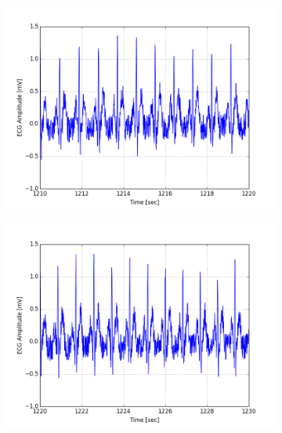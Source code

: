 \documentclass[paper=a4, fontsize=11pt]{scrartcl}
\numberwithin{equation}{section}		%
\numberwithin{figure}{section}			%
\numberwithin{table}{section}		    %
\begin{document}
\begin{appendices}
\begin{figure}[H]
	\centering
	\begin{subfigure}[b]{0.3\textwidth}
		\includegraphics[width=\textwidth]{sim/ecg_28}
	\end{subfigure}
	\begin{subfigure}[b]{0.3\textwidth}
		\includegraphics[width=\textwidth]{sim/ecg_29}
	\end{subfigure}
	\begin{subfigure}[b]{0.3\textwidth}

\end{subfigure}
\end{figure}
\end{appendices}
\end{document}
